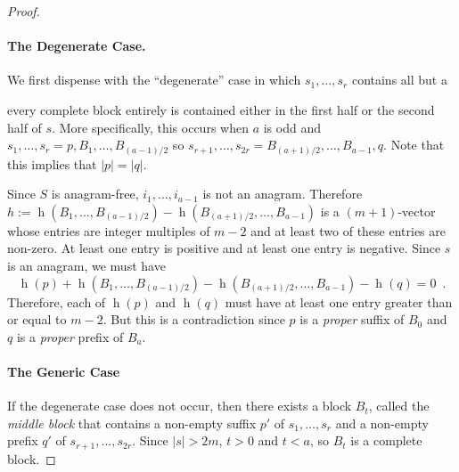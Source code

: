 \documentclass[kpfonts]{patmorin}
\DeclareMathOperator{\hist}{h}
\begin{document}
\begin{proof}

    \paragraph{The Degenerate Case.}
    We first dispense with the ``degenerate'' case in which $s_1,\ldots,s_r$ contains all but a

    every complete block entirely is contained either in the first half or the second half of $s$.  More specifically, this occurs when $a$ is odd and $s_1,\ldots,s_r=p,B_1,\ldots,B_{(a-1)/2}$ so $s_{r+1},\ldots,s_{2r}=B_{(a+1)/2},\ldots,B_{a-1},q$.  Note that this implies that $|p|=|q|$.

    Since $S$ is anagram-free, $i_1,\ldots,i_{a-1}$ is not an anagram.  Therefore $h:=\hist(B_1,\ldots,B_{(a-1)/2})-\hist(B_{(a+1)/2},\ldots,B_{a-1})$ is a $(m+1)$-vector whose entries are integer multiples of $m-2$ and at least two of these entries are non-zero. At least one entry is positive and at least one entry is negative.  Since $s$ is an anagram, we must have
    \[
        \hist(p) + \hist(B_1,\ldots,B_{(a-1)/2})-\hist(B_{(a+1)/2},\ldots,B_{a-1}) - \hist(q) = 0 \enspace .
    \]
    Therefore, each of $\hist(p)$ and $\hist(q)$ must have at least one entry greater than or equal to $m-2$.  But this is a contradiction since $p$ is a \emph{proper} suffix of $B_0$ and $q$ is a \emph{proper} prefix of $B_a$.

    \paragraph{The Generic Case}
    If the degenerate case does not occur, then there exists a block $B_t$, called the \emph{middle block} that contains a non-empty suffix $p'$ of $s_1,\ldots,s_r$ and a non-empty prefix $q'$ of $s_{r+1},\ldots,s_{2r}$.  Since $|s| > 2m$,  $t> 0$ and $t<a$, so $B_t$ is a complete block.


\end{proof}
\end{document}
